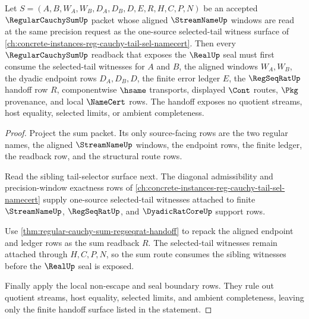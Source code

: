 \begin{theorem}
\label{thm:regular-cauchy-sum-tail-selector-handoff}
Let $S=(A,B,W_A,W_B,D_A,D_B,D,E,R,H,C,P,N)$ be an accepted $\RegularCauchySumUp$ packet whose aligned $\StreamNameUp$ windows are read at the same precision request as the one-source selected-tail witness surface of \autoref{ch:concrete-instances-reg-cauchy-tail-sel-namecert}. Then every $\RegularCauchySumUp$ readback that exposes the $\RealUp$ seal must first consume the selected-tail witnesses for $A$ and $B$, the aligned windows $W_A,W_B$, the dyadic endpoint rows $D_A,D_B,D$, the finite error ledger $E$, the $\RegSeqRatUp$ handoff row $R$, componentwise $\hsame$ transports, displayed $\Cont$ routes, $\Pkg$ provenance, and local $\NameCert$ rows. The handoff exposes no quotient streams, host equality, selected limits, or ambient completeness.
\end{theorem}
\begin{proof}
Project the sum packet. Its only source-facing rows are the two regular names, the aligned $\StreamNameUp$ windows, the endpoint rows, the finite ledger, the readback row, and the structural route rows.

Read the sibling tail-selector surface next. The diagonal admissibility and precision-window exactness rows of \autoref{ch:concrete-instances-reg-cauchy-tail-sel-namecert} supply one-source selected-tail witnesses attached to finite $\StreamNameUp$, $\RegSeqRatUp$, and $\DyadicRatCoreUp$ support rows.

Use \autoref{thm:regular-cauchy-sum-regseqrat-handoff} to repack the aligned endpoint and ledger rows as the sum readback $R$. The selected-tail witnesses remain attached through $H,C,P,N$, so the sum route consumes the sibling witnesses before the $\RealUp$ seal is exposed.

Finally apply the local non-escape and seal boundary rows. They rule out quotient streams, host equality, selected limits, and ambient completeness, leaving only the finite handoff surface listed in the statement.
\end{proof}

